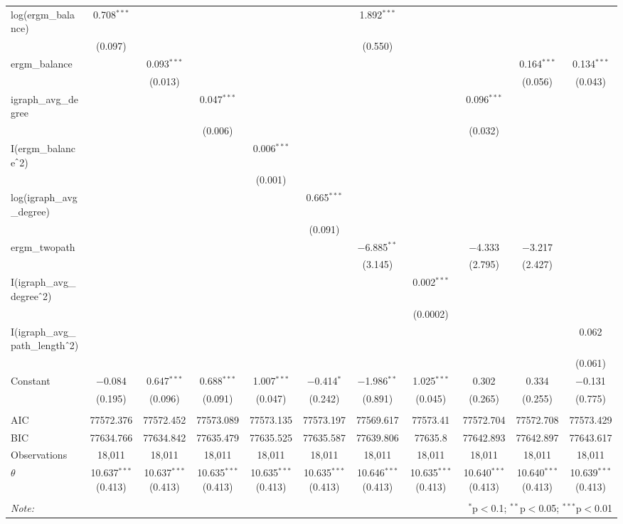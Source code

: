 \begin{table}[!htbp]
\begin{tabular}{@{\extracolsep{5pt}}lcccccccccc}
  log(ergm\_balance) & 0.708$^{***}$ &  &  &  &  & 1.892$^{***}$ &  &  &  &  \\ 
  & (0.097) &  &  &  &  & (0.550) &  &  &  &  \\ 
  ergm\_balance &  & 0.093$^{***}$ &  &  &  &  &  &  & 0.164$^{***}$ & 0.134$^{***}$ \\ 
  &  & (0.013) &  &  &  &  &  &  & (0.056) & (0.043) \\ 
  igraph\_avg\_degree &  &  & 0.047$^{***}$ &  &  &  &  & 0.096$^{***}$ &  &  \\ 
  &  &  & (0.006) &  &  &  &  & (0.032) &  &  \\ 
  I(ergm\_balance$\hat{\mkern6mu}$2) &  &  &  & 0.006$^{***}$ &  &  &  &  &  &  \\ 
  &  &  &  & (0.001) &  &  &  &  &  &  \\ 
  log(igraph\_avg\_degree) &  &  &  &  & 0.665$^{***}$ &  &  &  &  &  \\ 
  &  &  &  &  & (0.091) &  &  &  &  &  \\ 
  ergm\_twopath &  &  &  &  &  & $-$6.885$^{**}$ &  & $-$4.333 & $-$3.217 &  \\ 
  &  &  &  &  &  & (3.145) &  & (2.795) & (2.427) &  \\ 
  I(igraph\_avg\_degree$\hat{\mkern6mu}$2) &  &  &  &  &  &  & 0.002$^{***}$ &  &  &  \\ 
  &  &  &  &  &  &  & (0.0002) &  &  &  \\ 
  I(igraph\_avg\_path\_length$\hat{\mkern6mu}$2) &  &  &  &  &  &  &  &  &  & 0.062 \\ 
  &  &  &  &  &  &  &  &  &  & (0.061) \\ 
  Constant & $-$0.084 & 0.647$^{***}$ & 0.688$^{***}$ & 1.007$^{***}$ & $-$0.414$^{*}$ & $-$1.986$^{**}$ & 1.025$^{***}$ & 0.302 & 0.334 & $-$0.131 \\ 
  & (0.195) & (0.096) & (0.091) & (0.047) & (0.242) & (0.891) & (0.045) & (0.265) & (0.255) & (0.775) \\ 
 \hline \\[-1.8ex] 
AIC & 77572.376 & 77572.452 & 77573.089 & 77573.135 & 77573.197 & 77569.617 & 77573.41 & 77572.704 & 77572.708 & 77573.429 \\ 
BIC & 77634.766 & 77634.842 & 77635.479 & 77635.525 & 77635.587 & 77639.806 & 77635.8 & 77642.893 & 77642.897 & 77643.617 \\ 
Observations & 18,011 & 18,011 & 18,011 & 18,011 & 18,011 & 18,011 & 18,011 & 18,011 & 18,011 & 18,011 \\ 
$\theta$ & 10.637$^{***}$  (0.413) & 10.637$^{***}$  (0.413) & 10.635$^{***}$  (0.413) & 10.635$^{***}$  (0.413) & 10.635$^{***}$  (0.413) & 10.646$^{***}$  (0.413) & 10.635$^{***}$  (0.413) & 10.640$^{***}$  (0.413) & 10.640$^{***}$  (0.413) & 10.639$^{***}$  (0.413) \\ 
\hline 
\hline \\[-1.8ex] 
\textit{Note:}  & \multicolumn{10}{r}{$^{*}$p$<$0.1; $^{**}$p$<$0.05; $^{***}$p$<$0.01} \\ 
\end{tabular} 
\end{table} 
